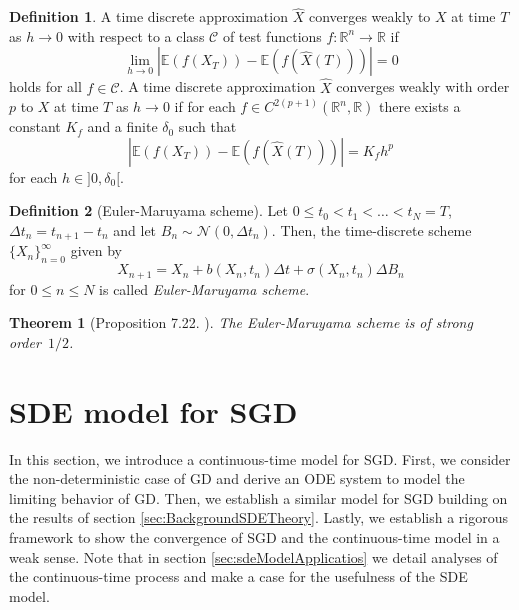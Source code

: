 \documentclass[12pt]{article}
\newtheorem{theorem}{Theorem}[section]
\theoremstyle{definition}
\newtheorem{definition}[definition]{Definition}
\numberwithin{equation}{section}
\newcommand{\CN}{\mathcal{N}}
\begin{document}
\begin{definition}
  A time discrete approximation $\widehat{X}$ converges weakly to $X$ at time $T$ as $h \rightarrow 0$ with respect to a class $\mathcal{C}$ of test functions $f: \mathbb{R}^n \rightarrow \mathbb{R}$ if 
  \begin{equation}
    \lim_{h \rightarrow 0} |\mathbb{E}(f(X_T)) - \mathbb{E}(f(\widehat{X}(T)))| = 0
  \end{equation}
  holds for all $f \in \mathcal{C}$.
  A time discrete approximation $\widehat{X}$ converges weakly with order $p$ to $X$ at time $T$ as $h \rightarrow 0$ if for each $f \in C^{2(p+1)}(\mathbb{R}^n, \mathbb{R})$ there exists a constant $K_f$ and a finite $\delta_0$ such that 
  \begin{equation}
     |\mathbb{E}(f(X_T)) - \mathbb{E}(f(\widehat{X}(T)))| = K_f h^p
  \end{equation}
  for each $h \in ]0, \delta_0[$.
\end{definition}
\begin{definition}[Euler-Maruyama scheme]
  Let $0 \leq t_0 < t_1 < \dots < t_N = T$, $\Delta t_n = t_{n+1} - t_n$ and let $B_n \sim \CN(0,\Delta t_n)$. Then, the time-discrete scheme $\{X_n\}_{n=0}^\infty$ given by
\begin{equation}
  \label{eq:euler_maruyama}
  X_{n+1} = X_n + b(X_n, t_n)\Delta t + \sigma(X_n, t_n) \Delta B_n
\end{equation}
for $0 \leq n \leq N$ is called \emph{Euler-Maruyama scheme}.
\end{definition}

\begin{theorem}[Proposition 7.22. ]
  The Euler-Maruyama scheme is of strong order~$1/2$.
\end{theorem}
\section{SDE model for SGD}
\label{sec:sde_model}
In this section, we introduce a continuous-time model for SGD. First, we consider the non-deterministic case of GD and derive an ODE system to model the limiting behavior of GD. Then, we establish a similar model for SGD building on the results of section \ref{sec:BackgroundSDETheory}. Lastly, we establish a rigorous framework to show the convergence of SGD and the continuous-time model in a weak sense.
Note that in section \ref{sec:sdeModelApplicatios} we detail analyses of the continuous-time process and make a case for the usefulness of the SDE model.
\end{document}
